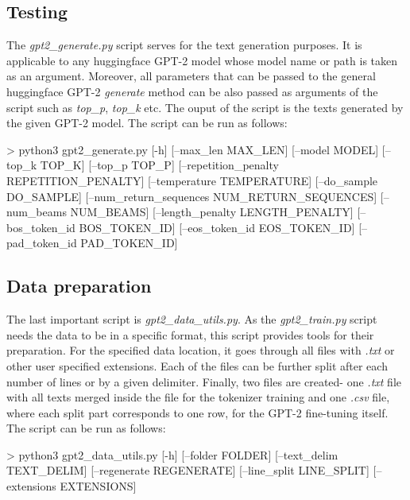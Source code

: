 \subsection*{Testing}
The \textit{gpt2\_generate.py} script serves for the text generation purposes. It is applicable to any huggingface GPT-2 model whose model name or path is taken as an argument. Moreover, all parameters that can be passed to the general huggingface GPT-2 \textit{generate} method can be also passed as arguments of the script such as \textit{top\_p}, \textit{top\_k} etc. The ouput of the script is the texts generated by the given GPT-2 model. The script can be run as follows:
\begin{code}
> python3 gpt2_generate.py [-h] [--max_len MAX_LEN] 
                          [--model MODEL] 
                          [--top_k TOP_K] 
                          [--top_p TOP_P] 
                          [--repetition_penalty REPETITION_PENALTY] 
                          [--temperature TEMPERATURE] 
                          [--do_sample DO_SAMPLE]
                          [--num_return_sequences NUM_RETURN_SEQUENCES]
                          [--num_beams NUM_BEAMS]
                          [--length_penalty LENGTH_PENALTY] 
                          [--bos_token_id BOS_TOKEN_ID] 
                          [--eos_token_id EOS_TOKEN_ID]
                          [--pad_token_id PAD_TOKEN_ID]
\end{code}

\subsection*{Data preparation}
The last important script is \textit{gpt2\_data\_utils.py}. As the \textit{gpt2\_train.py} script needs the data to be in a specific format, this script provides tools for their preparation. For the specified data location, it goes through all files with \textit{.txt} or other user specified extensions. Each of the files can be further split after each number of lines or by a given delimiter. Finally, two files are created- one \textit{.txt} file with all texts merged inside the file for the tokenizer training and one \textit{.csv} file, where each split part corresponds to one row, for the GPT-2 fine-tuning itself. The script can be run as follows:\\
\begin{code}
> python3 gpt2_data_utils.py [-h] [--folder FOLDER] 
                             [--text_delim TEXT_DELIM] 
                             [--regenerate REGENERATE] 
                             [--line_split LINE_SPLIT] 
                             [--extensions EXTENSIONS]
\end{code}

